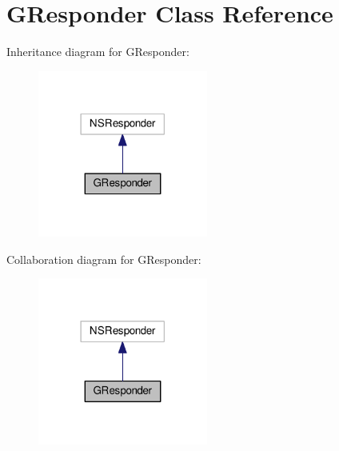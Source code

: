 \hypertarget{interfaceGResponder}{}\section{G\+Responder Class Reference}
\label{interfaceGResponder}


Inheritance diagram for G\+Responder\+:
\nopagebreak
\begin{figure}[H]
\begin{center}
\leavevmode
\includegraphics[width=158pt]{interfaceGResponder__inherit__graph}
\end{center}
\end{figure}


Collaboration diagram for G\+Responder\+:
\nopagebreak
\begin{figure}[H]
\begin{center}
\leavevmode
\includegraphics[width=158pt]{interfaceGResponder__coll__graph}
\end{center}
\end{figure}
